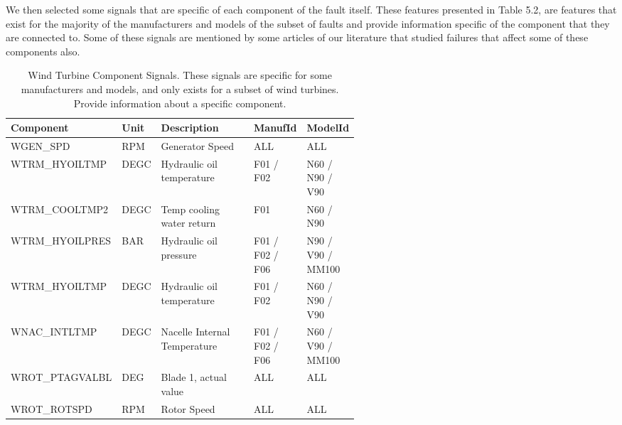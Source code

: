 We then selected some signals that are specific of each component of the fault itself. These features presented in Table 5.2, are features that exist for the majority of the manufacturers and models of the subset of faults and provide information specific of the component that they are connected to.
Some of these signals are mentioned by some articles of our literature that studied failures that affect some of these components also.

%

\begin{table}[!ht]
    \centering
    \begin{tabular}{|l|l|p{0.27\linewidth}|p{0.15\linewidth}|p{0.15\linewidth}|}
    \hline
        Component & Unit & Description & ManufId & ModelId \\ \hline
        WGEN\_SPD & RPM & Generator Speed & ALL & ALL \\ \hline
        WTRM\_HYOILTMP & DEGC & Hydraulic oil temperature & F01 / F02 & N60 / N90 / V90 \\ \hline
        WTRM\_COOLTMP2 & DEGC & Temp cooling water return & F01 & N60 / N90 \\ \hline
        WTRM\_HYOILPRES & BAR & Hydraulic oil pressure & F01 / F02 / F06 & N90 / V90 / MM100 \\ \hline
        WTRM\_HYOILTMP & DEGC & Hydraulic oil temperature & F01 / F02 & N60 / N90 / V90 \\ \hline
        WNAC\_INTLTMP & DEGC & Nacelle Internal Temperature & F01 / F02 / F06 & N60 / V90 / MM100 \\ \hline
        WROT\_PTAGVALBL & DEG & Blade 1, actual value & ALL & ALL \\ \hline
        WROT\_ROTSPD & RPM & Rotor Speed & ALL & ALL \\ \hline
    \end{tabular}
    \caption{Wind Turbine Component Signals. These signals are specific for some manufacturers and models, and only exists for a subset of wind turbines. Provide information about a specific component.}
    \label{ComponentSignals}
\end{table}

